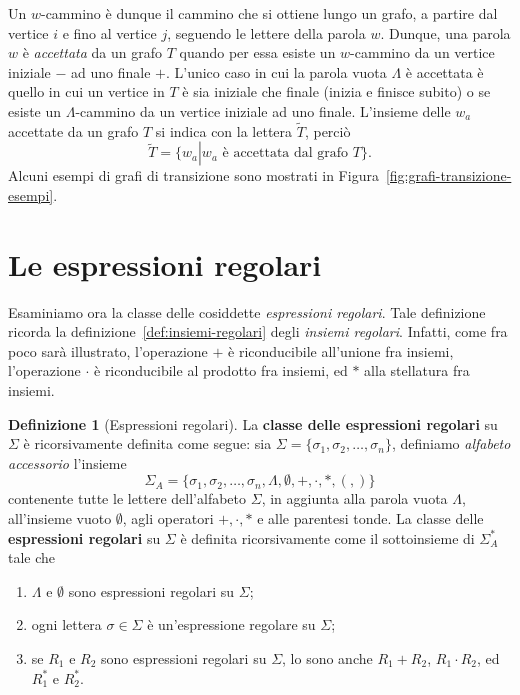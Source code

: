 \documentclass[10pt]{\classname}
\theoremstyle{newlinethm}
\theoremstyle{theorem}
\theoremstyle{definition}
\newtheorem{definizione}{Definizione}[section]
\theoremstyle{definition}
\theoremstyle{definition}
\theoremstyle{definition}
\begin{document}
Un $w$-cammino è dunque il cammino che si ottiene lungo un grafo, a partire dal vertice $i$ e fino al vertice $j$, seguendo le lettere della parola $w$. Dunque, una parola $w$ è \emph{accettata} da un grafo $T$ quando per essa esiste un $w$-cammino da un vertice iniziale $-$ ad uno finale $+$. L'unico caso in cui la parola vuota $\Lambda$ è accettata è quello in cui un vertice in $T$ è sia iniziale che finale (inizia e finisce subito) o se esiste un $\Lambda$-cammino da un vertice iniziale ad uno finale. L'insieme delle $w_a$ accettate da un grafo $T$ si indica con la lettera $\tilde{T}$, perciò \[\tilde T = \{w_a \left|\right. w_a \mbox{ è accettata dal grafo } T\}.\] Alcuni esempi di grafi di transizione sono mostrati in Figura~\ref{fig:grafi-transizione-esempi}.


\section{Le espressioni regolari}

Esaminiamo ora la classe delle cosiddette \emph{espressioni regolari}. Tale definizione ricorda la definizione~\ref{def:insiemi-regolari} degli \emph{insiemi regolari}. Infatti, come fra poco sarà illustrato, l'operazione $+$ è riconducibile all'unione fra insiemi, l'operazione $\cdot$ è riconducibile al prodotto fra insiemi, ed $*$ alla stellatura fra insiemi.

\begin{definizione}[Espressioni regolari]\label{def:espressioni-regolari}
La \textbf{classe delle espressioni regolari} su $\Sigma$ è ricorsivamente definita come segue: sia $\Sigma = \{\sigma_1, \sigma_2, \dots, \sigma_n\}$, definiamo \emph{alfabeto accessorio} l'insieme \[\Sigma_A = \{\sigma_1, \sigma_2, \dots, \sigma_n, \Lambda, \emptyset, +, \cdot, *, (, )\}\] contenente tutte le lettere dell'alfabeto $\Sigma$, in aggiunta alla parola vuota $\Lambda$, all'insieme vuoto $\emptyset$, agli operatori $+, \cdot, *$ e alle parentesi tonde. La classe delle \textbf{espressioni regolari} su $\Sigma$ è definita ricorsivamente come il sottoinsieme di $\Sigma_A^*$ tale che 
\begin{enumerate}
    \item $\Lambda$ e $\emptyset$ sono espressioni regolari su $\Sigma$;
    \item ogni lettera $\sigma \in \Sigma$ è un'espressione regolare su
        $\Sigma$;
    \item se $R_1$ e $R_2$ sono espressioni regolari su $\Sigma$, lo sono anche
        $R_1 + R_2$, $R_1 \cdot R_2$, ed $R_1^*$ e $R_2^*$.
\end{enumerate}
\end{definizione}
\end{document}
